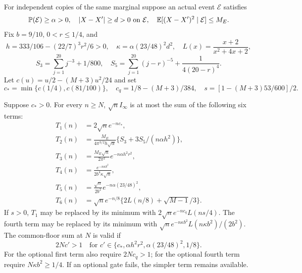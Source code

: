 For independent copies of the same marginal suppose an actual event
$\mathcal E$ satisfies
\[
 \mathbb P(\mathcal E)\ge\alpha>0,\quad |X-X'|\ge d>0\text{ on }\mathcal E,
 \quad\mathbb E[(X-X')^2\mid\mathcal E]\le M_E.
\]
Fix $b=9/10$, $0<r\le1/4$, and
\[
 h=333/106-(22/7)^3r^2/6>0,\quad
 \kappa=\alpha(23/48)^2d^2,\quad L(x)=\frac{x+2}{x^2+4x+2},
\]
\[
 S_3=\sum_{j=1}^{20}j^{-3}+1/800,\quad
 S_5=\sum_{j=1}^{20}(j-r)^{-5}+\frac1{4(20-r)^4}.
\]
Let $c(u)=u/2-(M+3)u^2/24$ and set
\[
 c_* =\min\{c(1/4),c(81/100)\},\quad
 c_q=1/8-(M+3)/384,\quad s=[1-(M+3)53/600]/2.
\]
\begin{proposition}\label{v9:fourier:high}
Suppose $c_*>0$. For every $n\ge N$, $\sqrt n I_\infty$ is at most
the sum of the following six terms:
\begin{align*}
 T_1(n)&=2\sqrt n e^{-nc_*},\\
 T_2(n)&=\frac{M_E}{4\pi^{3/2}h\sqrt\alpha}
       \{S_3+3S_5/(n\alpha h^2)\},\\
 T_3(n)&=\frac{M_E\sqrt n}{2\pi^2}e^{-n\alpha h^2r^2},\\
 T_4(n)&=\frac{e^{-n\kappa b^2}}{2b^4\kappa\sqrt n},\\
 T_5(n)&=\frac{\sqrt n}{2b^2}e^{-n\alpha(23/48)^2},\\
 T_6(n)&=\sqrt n e^{-n/8}\{2L(n/8)+\sqrt{M-1}/3\}.
\end{align*}
If $s>0$, $T_1$ may be replaced by its minimum with
$2\sqrt n e^{-nc_q}L(ns/4)$. The fourth term may be replaced by
its minimum with $\sqrt n e^{-n\kappa b^2}L(n\kappa b^2)/(2b^2)$.
The common-floor sum at $N$ is valid if
\[
 2Nc'>1\quad\text{for }c'\in\{c_*,\alpha h^2r^2,
                      \alpha(23/48)^2,1/8\}.
\]
For the optional first term also require $2Nc_q>1$; for the optional
fourth term require $N\kappa b^2\ge1/4$. If an optional gate fails,
the simpler term remains available.
\end{proposition}
